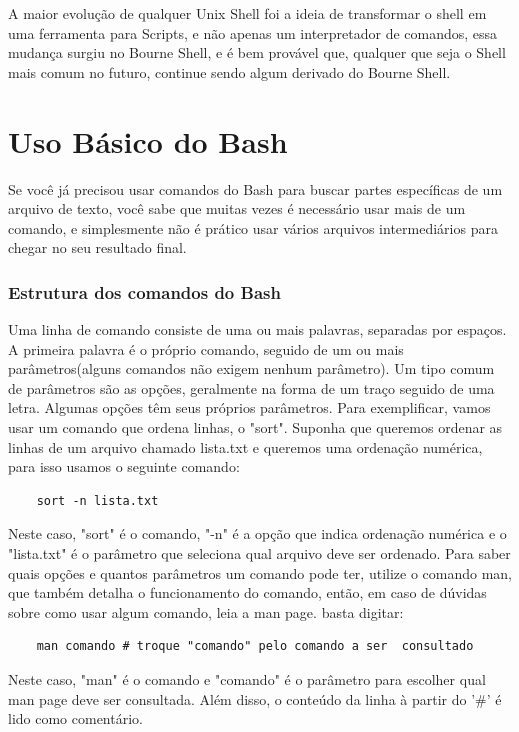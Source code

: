 \documentclass[oneside, 11 pt]{article}
\begin{document}
	A maior evolução de qualquer Unix Shell foi a ideia de transformar o shell em uma ferramenta para Scripts, e não apenas um interpretador de comandos, essa mudança surgiu no Bourne Shell, e é bem provável que, qualquer que seja o Shell mais comum no futuro, continue sendo algum derivado do Bourne Shell.
	
	\newpage
	\part{Uso Básico do Bash}
	
	Se você já precisou usar comandos do Bash para buscar partes específicas de um arquivo de texto, você sabe que muitas vezes é necessário usar mais de um comando, e simplesmente não é prático usar vários arquivos intermediários para chegar no seu resultado final.
	
	\section{Estrutura dos comandos do Bash}
	Uma linha de comando consiste de uma ou mais palavras, separadas por espaços. A primeira palavra é o próprio comando, seguido de um ou mais parâmetros(alguns comandos não exigem nenhum parâmetro). Um tipo comum de parâmetros são as opções, geralmente na forma de um traço seguido de uma letra. Algumas opções têm seus próprios parâmetros. Para exemplificar, vamos usar um comando que ordena linhas, o "sort". Suponha que queremos ordenar as linhas de um arquivo chamado lista.txt e queremos uma ordenação numérica, para isso usamos o seguinte comando:
	\begin{lstlisting}
	sort -n lista.txt
	\end{lstlisting}
	Neste caso, "sort" é o comando, "-n" é a opção que indica ordenação numérica e o "lista.txt" é o parâmetro que seleciona qual arquivo deve ser ordenado.
	Para saber quais opções e quantos parâmetros um comando pode ter, utilize o comando man, que também detalha o funcionamento do comando, então, em caso de dúvidas sobre como usar algum comando, leia a man page. basta digitar:
	\begin{lstlisting}
	man comando # troque "comando" pelo comando a ser  consultado
	\end{lstlisting}
	Neste caso, "man" é o comando e "comando" é o parâmetro para escolher qual man page deve ser consultada. Além disso, o conteúdo da linha à partir do '\#' é lido como comentário.
	
\end{document}
